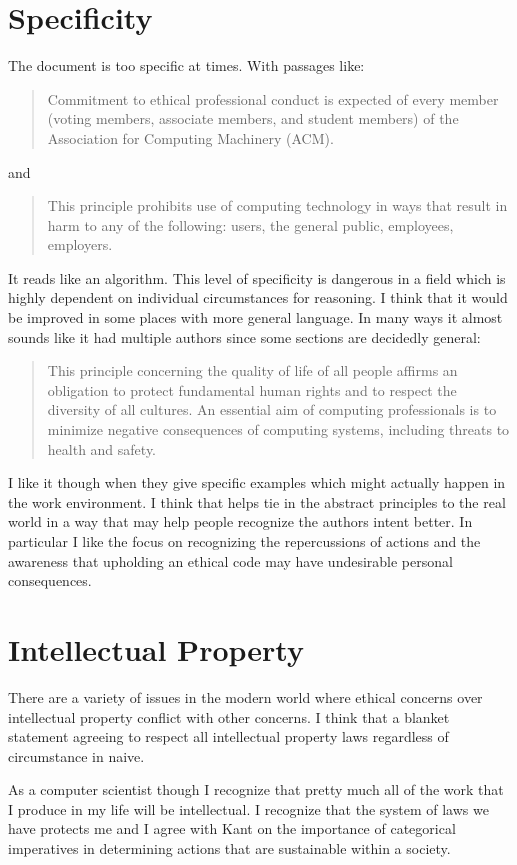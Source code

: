 \documentclass[12pt,a4paper,twoside]{article}  %
\begin{document}
\section{Specificity}
The document is too specific at times. With passages like:
\begin{quote}
Commitment to ethical professional conduct is expected of every member
(voting members, associate members, and student members) of the
Association for Computing Machinery (ACM).
\end{quote}
and
\begin{quote}
This principle prohibits use of computing technology in ways that
result in harm to any of the following: users, the general public,
employees, employers.
\end{quote}
It reads like an algorithm. This level of specificity is dangerous in
a field which is highly dependent on individual circumstances for
reasoning. I think that it would be improved in some places with more
general language. In many ways it almost sounds like it had multiple
authors since some sections are decidedly general:
\begin{quote}
This principle concerning the quality of life of all people affirms an
obligation to protect fundamental human rights and to respect the
diversity of all cultures. An essential aim of computing professionals
is to minimize negative consequences of computing systems, including
threats to health and safety.
\end{quote}

I like it though when they give specific examples which might actually
happen in the work environment. I think that helps tie in the abstract
principles to the real world in a way that may help people recognize
the authors intent better. In particular I like the focus on
recognizing the repercussions of actions and the awareness that
upholding an ethical code may have undesirable personal consequences.

\section{Intellectual Property}
There are a variety of issues in the modern world where ethical
concerns over intellectual property conflict with other concerns. I
think that a blanket statement agreeing to respect all intellectual
property laws regardless of circumstance in naive.

As a computer scientist though I recognize that pretty much all of the
work that I produce in my life will be intellectual. I recognize that
the system of laws we have protects me and I agree with Kant on the
importance of categorical imperatives in determining actions that are
sustainable within a society.
\end{document}
